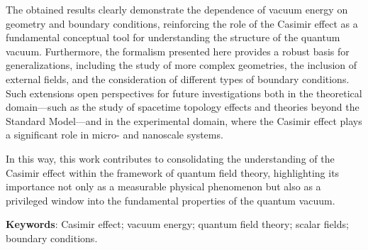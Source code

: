 The obtained results clearly demonstrate the dependence of vacuum energy on geometry and boundary conditions, reinforcing the role of the Casimir effect as a fundamental conceptual tool for understanding the structure of the quantum vacuum. Furthermore, the formalism presented here provides a robust basis for generalizations, including the study of more complex geometries, the inclusion of external fields, and the consideration of different types of boundary conditions. Such extensions open perspectives for future investigations both in the theoretical domain—such as the study of spacetime topology effects and theories beyond the Standard Model—and in the experimental domain, where the Casimir effect plays a significant role in micro- and nanoscale systems.

In this way, this work contributes to consolidating the understanding of the Casimir effect within the framework of quantum field theory, highlighting its importance not only as a measurable physical phenomenon but also as a privileged window into the fundamental properties of the quantum vacuum.

\vspace*{2em}


\textbf{Keywords}: Casimir effect; vacuum energy; quantum field theory; scalar fields; boundary conditions.